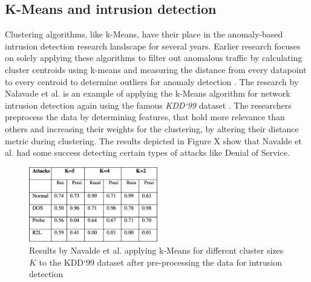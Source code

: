 \documentclass[
    fontsize=12pt,
    headings=small,
    parskip=half,           %
    bibliography=totoc,
    numbers=noenddot,       %
    open=any,               %
    ]{scrreprt}
\begin{document}
\subsection{K-Means and intrusion detection}
\label{subsec:k_means_intrusion_detection}
Clustering algorithms, like k-Means, have their place in the anomaly-based intrusion detection research landscape for several years. Earlier research focuses on solely applying these algorithms to filter out anomalous traffic by calculating cluster centroids using k-means and measuring the distance from every datapoint to every centroid to determine outliers for anomaly detection \cite{munz2007traffic}. The research by Nalavade et al. \cite{nalavade2014} is an example of applying the k-Means algorithm for network intrusion detection again using the famous \emph{KDD`99} dataset \cite{kdd1999}. The researchers preprocess the data by determining features, that hold more relevance than others and increasing their weights for the clustering, by altering their distance metric during clustering. The results depicted in Figure X show that Navalde et al. had some success detecting certain types of attacks like Denial of Service. 

\begin{figure}[H]
	\sffamily\footnotesize
	\includegraphics[width=0.5\textwidth]{pic/navalde_k_means.png}
	\unitlength=0.75mm
	\linethickness{0.4pt}
	\caption{Results by Navalde et al. applying k-Means for different cluster sizes $K$ to the KDD`99 dataset after pre-processing the data for intrusion detection \cite{nalavade2014}}
	\label{fig:k_means_navalde}
\end{figure}
\end{document}
